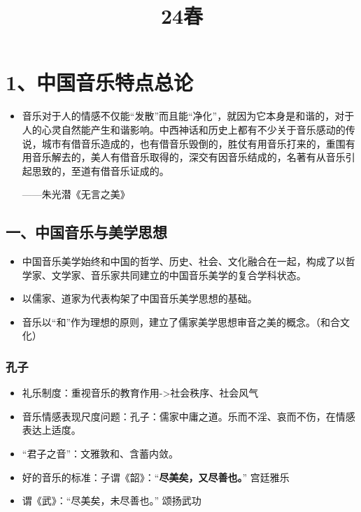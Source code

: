 \documentclass[
]{article}
\title{24春}
\author{}
\date{}
\providecommand{\tightlist}{%
  \setlength{\itemsep}{0pt}\setlength{\parskip}{0pt}}
\begin{document}
\maketitle

\section{1、中国音乐特点总论}\label{ux4e2dux56fdux97f3ux4e50ux7279ux70b9ux603bux8bba}


\begin{itemize}
\item
  音乐对于人的情感不仅能``发散''而且能``净化''，就因为它本身是和谐的，对于人的心灵自然能产生和谐影响。中西神话和历史上都有不少关于音乐感动的传说，城市有借音乐造成的，也有借音乐毁倒的，胜仗有用音乐打来的，重围有用音乐解去的，美人有借音乐取得的，深交有因音乐结成的，名著有从音乐引起思致的，至道有借音乐证成的。

  ------朱光潜《无言之美》
\end{itemize}

\subsection{一、中国音乐与美学思想}\label{ux4e00ux4e2dux56fdux97f3ux4e50ux4e0eux7f8eux5b66ux601dux60f3}

\begin{itemize}
\tightlist
\item
  中国音乐美学始终和中国的哲学、历史、社会、文化融合在一起，构成了以哲学家、文学家、音乐家共同建立的中国音乐美学的复合学科状态。
\item
  以儒家、道家为代表构架了中国音乐美学思想的基础。
\item
  音乐以``和''作为理想的原则，建立了儒家美学思想审音之美的概念。（和合文化）
\end{itemize}

\subsubsection{孔子}\label{ux5b54ux5b50}

\begin{itemize}
\tightlist
\item
  礼乐制度：重视音乐的教育作用-\textgreater 社会秩序、社会风气
\item
  音乐情感表现尺度问题：孔子：儒家中庸之道。乐而不淫、哀而不伤，在情感表达上适度。
\item
  ``君子之音''：文雅敦和、含蓄内敛。
\item
  好的音乐的标准：子谓《韶》：``\textbf{尽美矣，又尽善也。}'' 宫廷雅乐
\item
  谓《武》：``尽美矣，未尽善也。'' 颂扬武功
\end{itemize}
\end{document}
